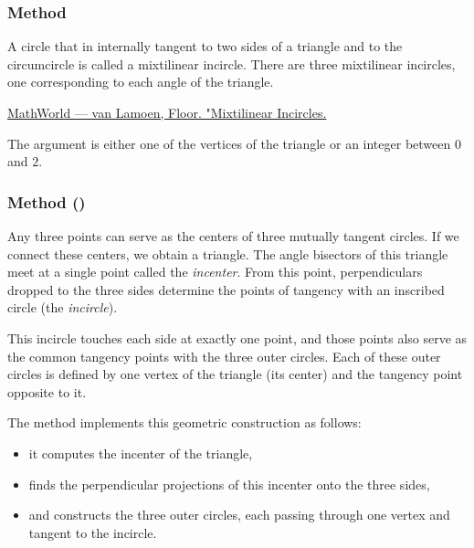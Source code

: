 \subsubsection{Method }
\label{ssub:method_triangle_mixti}

A circle that in internally tangent to two sides of a triangle and to the circumcircle is called a mixtilinear incircle. There are three mixtilinear incircles, one corresponding to each angle of the triangle.
\begin{flushright}
\small
\href{https://mathworld.wolfram.com/MixtilinearIncircles.html}{MathWorld — van Lamoen, Floor. "Mixtilinear Incircles.}
\end{flushright}

The argument is either one of the vertices of the triangle or an integer between $0$
 and $2$.

\begin{tkzexample}[latex=.52\textwidth]
\end{tkzexample}

\subsubsection{Method ()}
\label{ssub:method_triangle_three_tgt_c}

Any three points can serve as the centers of three mutually tangent circles.
If we connect these centers, we obtain a triangle.
The angle bisectors of this triangle meet at a single point called the \emph{incenter}.
From this point, perpendiculars dropped to the three sides determine the points of tangency with an inscribed circle (the \emph{incircle}).

\medskip
This incircle touches each side at exactly one point, and those points also serve as the common tangency points with the three outer circles.
Each of these outer circles is defined by one vertex of the triangle (its center) and the tangency point opposite to it.

\medskip
The method  implements this geometric construction as follows:
\begin{itemize}
  \item it computes the incenter of the triangle,
  \item finds the perpendicular projections of this incenter onto the three sides,
  \item and constructs the three outer circles, each passing through one vertex and tangent to the incircle.
\end{itemize}



